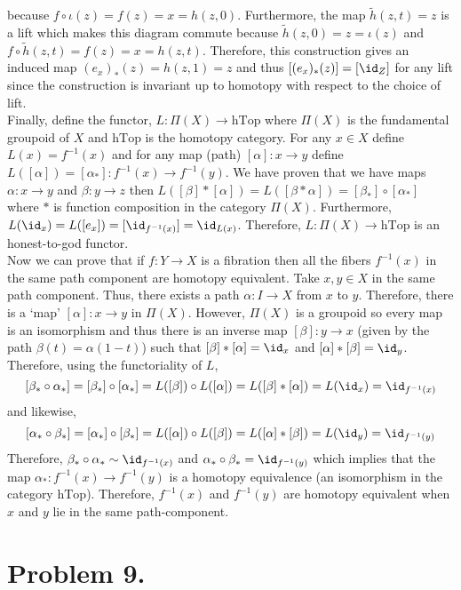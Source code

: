 \documentclass[12pt]{extarticle}
\begin{document}
because $f \circ \iota(z) = f(z) = x = h(z, 0)$. Furthermore, the map $\tilde{h}(z, t) = z$ is a lift which makes this diagram commute because $\tilde{h}(z, 0) = z = \iota(z)$ and $f \circ \tilde{h}(z, t) = f(z) = x = h(z, t)$. Therefore, this construction gives an induced map $(e_x)_*(z) = h(z, 1) = z$ and thus $[(e_x)_*(z)] = [\id_Z]$ for any lift since the construction is invariant up to homotopy with respect to the choice of lift. 
\bigskip\\
Finally, define the functor, $L : \Pi(X) \to \mathrm{hTop}$ where $\Pi(X)$ is the fundamental groupoid of $X$ and $\mathrm{hTop}$ is the homotopy category. For any $x \in X$ define $L(x) = f^{-1}(x)$ and for any map (path) $[\alpha] : x \to y$ define $L([\alpha]) = [\alpha_*] : f^{-1}(x) \to f^{-1}(y)$. We have proven that we have maps $\alpha : x \to y$ and $\beta : y \to z$ then $L([\beta] * [\alpha]) = L([\beta * \alpha]) = [\beta_*] \circ [\alpha_*]$ where $*$ is function composition in the category $\Pi(X)$. Furthermore, $L(\id_{x}) = L([e_x]) = [\id_{f^{-1}(x)}] = \id_{L(x)}$. Therefore, $L : \Pi(X) \to \mathrm{hTop}$ is an honest-to-god functor.
\bigskip\\
Now we can prove that if $f : Y \to X$ is a fibration then all the fibers $f^{-1}(x)$ in the same path component are homotopy equivalent. Take $x, y \in X$ in the same path component. Thus, there exists a path $\alpha : I \to X$ from $x$ to $y$. Therefore, there is a `map' $[\alpha] : x \to y$ in $\Pi(X)$. However, $\Pi(X)$ is a groupoid so every map is an isomorphism and thus there is an inverse map $[\beta] : y \to x$ (given by the path $\beta(t) = \alpha(1 - t)$) such that $[\beta] * [\alpha] = \id_{x}$ and $[\alpha] * [\beta] = \id_y$. Therefore, using the functoriality of $L$,
\[ [\beta_* \circ \alpha_*] = [\beta_*] \circ [\alpha_*] = L([\beta]) \circ L([\alpha]) = L([\beta] * [\alpha]) = L(\id_{x}) = \id_{f^{-1}(x)} \]
and likewise, 
\[ [\alpha_* \circ \beta_*] = [\alpha_*] \circ [\beta_*] = L([\alpha]) \circ L([\beta]) = L([\alpha] * [\beta]) = L(\id_{y}) = \id_{f^{-1}(y)} \]
Therefore, $\beta_* \circ \alpha_* \sim \id_{f^{-1}(x)}$ and $\alpha_* \circ \beta_* = \id_{f^{-1}(y)}$ which implies that the map $\alpha_* : f^{-1}(x) \to f^{-1}(y)$ is a homotopy equivalence (an isomorphism in the category $\mathrm{hTop}$). Therefore, $f^{-1}(x)$ and $f^{-1}(y)$ are homotopy equivalent when $x$ and $y$ lie in the same path-component. 

\newpage

\section*{Problem 9.}
\end{document}
